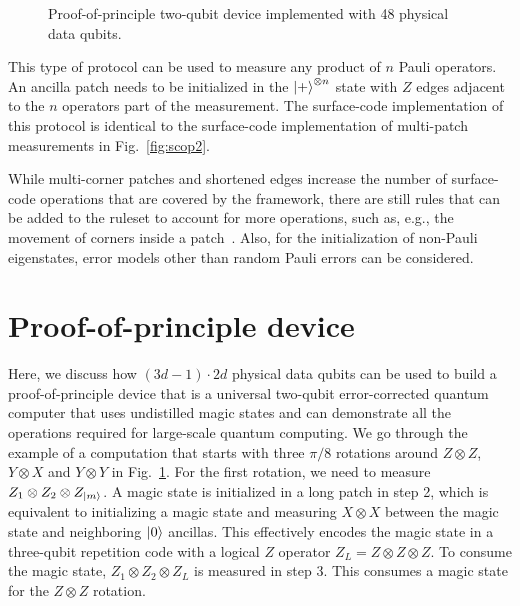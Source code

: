 \documentclass[prx,aps,letterpaper,twocolumn,allowfontchageintitle=true,accepted=2019-02-01]{quantumarticle}
\begin{document}
\begin{figure}[!t]
\centering
\def\svgwidth{\linewidth}

\caption{Proof-of-principle two-qubit device implemented with 48 physical data qubits.}
\label{fig:proofofprinciple}
\end{figure}


This type of protocol can be used to measure any product of $n$ Pauli operators. An ancilla patch needs to be initialized in the $\ket{+}^{\otimes n}$ state with $Z$ edges adjacent to the $n$ operators part of the measurement. The surface-code implementation of this protocol is identical to the surface-code implementation of multi-patch measurements in Fig.~\ref{fig:scop2}.

While multi-corner patches and shortened edges increase the number of surface-code operations that are covered by the framework, there are still rules that can be added to the ruleset to account for more operations, such as, e.g., the movement of corners inside a patch~\cite{Brown2017}. Also, for the initialization of non-Pauli eigenstates, error models other than random Pauli errors can be considered.



\section{Proof-of-principle device}
\label{app:proofofprinciple}

Here, we discuss how $(3d-1)\cdot 2d$ physical data qubits can be used to build a proof-of-principle device that is a universal two-qubit error-corrected quantum computer that uses undistilled magic states and can demonstrate all the operations required for large-scale quantum computing. We go through the example of a computation that starts with three $\pi/8$ rotations around $Z\otimes Z$, $Y \otimes X$ and $Y \otimes Y$ in Fig.~\ref{fig:proofofprinciple}. For the first rotation, we need to measure $Z_1 \otimes Z_2 \otimes Z_{\ket{m}}$. A magic state is initialized in a long patch in step 2, which is equivalent to initializing a magic state and measuring $X \otimes X$ between the magic state and neighboring $\ket{0}$ ancillas. This effectively encodes the magic state in a three-qubit repetition code with a logical $Z$ operator $Z_L = Z \otimes Z \otimes Z$. To consume the magic state, $Z_1 \otimes Z_2 \otimes Z_L$ is measured in step 3. This consumes a magic state for the $Z\otimes Z$ rotation.
\end{document}
